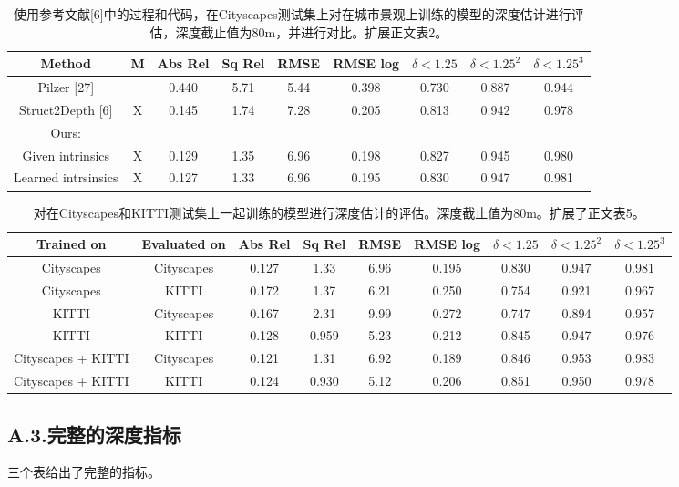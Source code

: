 \documentclass[10pt,journal,compsoc,UTF8]{IEEEtran}
\begin{document}
\begin{table}
  \centering
  \begin{tabular}{|c|c|c|c|c|c|c|c|c|}
  \hline
  Method&M&Abs Rel&Sq Rel&RMSE&RMSE log&$\delta<1.25$&$\delta<1.25^2$&$\delta<1.25^3$\\
  \hline
  Pilzer [27] & & 0.440& 5.71& 5.44& 0.398& 0.730& 0.887& 0.944\\
  Struct2Depth [6] &X& 0.145& 1.74& 7.28& 0.205& 0.813& 0.942& 0.978\\
  \hline
  Ours:& &  &  &  &  &  &  &  \\
  Given intrinsics &X& 0.129& 1.35& 6.96& 0.198& 0.827& 0.945& 0.980\\
  Learned intrsinsics &X& 0.127& 1.33& 6.96& 0.195& 0.830& 0.947& 0.981\\
  \hline
  \end{tabular}
  \caption{使用参考文献[6]中的过程和代码，在Cityscapes测试集上对在城市景观上训练的模型的深度估计进行评估，深度截止值为80m，并进行对比。扩展正文表2。}
  
\end{table}

\begin{table}
  \centering
  \begin{tabular}{|c|c|c|c|c|c|c|c|c|}
  \hline
  Trained on&Evaluated on&Abs Rel&Sq Rel&RMSE&RMSE log&$\delta<1.25$&$\delta<1.25^2$&$\delta<1.25^3$\\
  \hline
  Cityscapes& Cityscapes& 0.127& 1.33& 6.96& 0.195& 0.830& 0.947& 0.981\\
  Cityscapes& KITTI& 0.172& 1.37& 6.21& 0.250& 0.754& 0.921& 0.967\\
  \hline
  KITTI& Cityscapes& 0.167& 2.31& 9.99& 0.272& 0.747& 0.894& 0.957\\
  KITTI& KITTI& 0.128& 0.959& 5.23& 0.212& 0.845& 0.947& 0.976\\
  \hline
  Cityscapes + KITTI& Cityscapes& 0.121& 1.31& 6.92& 0.189& 0.846& 0.953& 0.983\\
  Cityscapes + KITTI& KITTI& 0.124& 0.930& 5.12& 0.206& 0.851& 0.950& 0.978\\
  \hline
  \end{tabular}
  \caption{对在Cityscapes和KITTI测试集上一起训练的模型进行深度估计的评估。深度截止值为80m。扩展了正文表5。}
  
\end{table}

\subsection*{A.3.完整的深度指标}
三个表给出了完整的指标。
\end{document}
